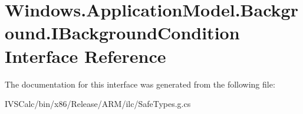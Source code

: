 \hypertarget{interface_windows_1_1_application_model_1_1_background_1_1_i_background_condition}{}\section{Windows.\+Application\+Model.\+Background.\+I\+Background\+Condition Interface Reference}
\label{interface_windows_1_1_application_model_1_1_background_1_1_i_background_condition}


The documentation for this interface was generated from the following file\+:\begin{DoxyCompactItemize}
\item 
I\+V\+S\+Calc/bin/x86/\+Release/\+A\+R\+M/ilc/Safe\+Types.\+g.\+cs\end{DoxyCompactItemize}
